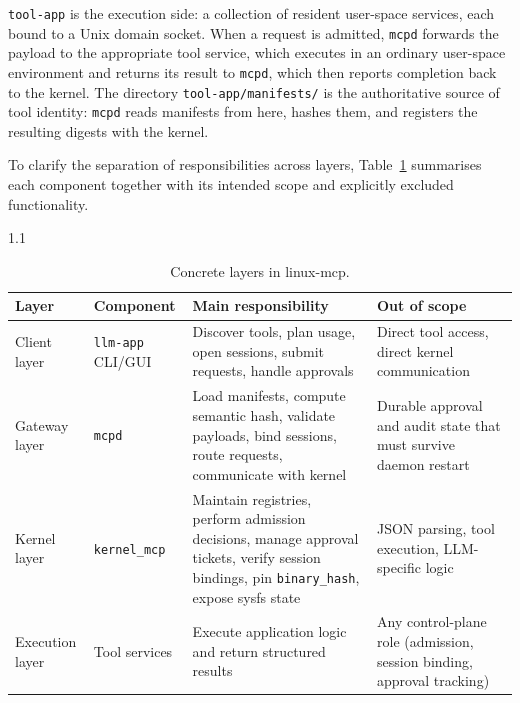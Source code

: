 \texttt{tool-app} is the execution side: a collection of resident user-space services, each bound to a Unix domain socket.
When a request is admitted, \texttt{mcpd} forwards the payload to the appropriate tool service, which executes in an ordinary user-space environment and returns its result to \texttt{mcpd}, which then reports completion back to the kernel.
The directory \texttt{tool-app/\allowbreak manifests/} is the authoritative source of tool identity: \texttt{mcpd} reads manifests from here, hashes them, and registers the resulting digests with the kernel.


To clarify the separation of responsibilities across layers, Table~\ref{tab:architecture_layers} summarises each component together with its intended scope and explicitly excluded functionality.

\begin{table}[htbp]
\centering
\caption{Concrete layers in linux-mcp.}
\label{tab:architecture_layers}
\small
\begin{spacing}{1.1}
\begin{tabular}{l p{3cm} p{4.8cm} p{4.5cm}}
\toprule
\textbf{Layer} & \textbf{Component} & \textbf{Main responsibility} & \textbf{Out of scope} \\
\midrule

Client layer
& \texttt{llm-app} CLI/GUI
& Discover tools, plan usage, open sessions, submit requests, handle approvals
& Direct tool access, direct kernel communication \\

Gateway layer
& \texttt{mcpd}
& Load manifests, compute semantic hash, validate payloads, bind sessions, route requests, communicate with kernel
& Durable approval and audit state that must survive daemon restart \\

Kernel layer
& \texttt{kernel\_\allowbreak mcp}
& Maintain registries, perform admission decisions, manage approval tickets, verify session bindings, pin \texttt{binary\_\allowbreak hash}, expose sysfs state
& JSON parsing, tool execution, LLM-specific logic \\

Execution layer
& Tool services
& Execute application logic and return structured results
& Any control-plane role (admission, session binding, approval tracking) \\

\bottomrule
\end{tabular}
\end{spacing}
\end{table}



